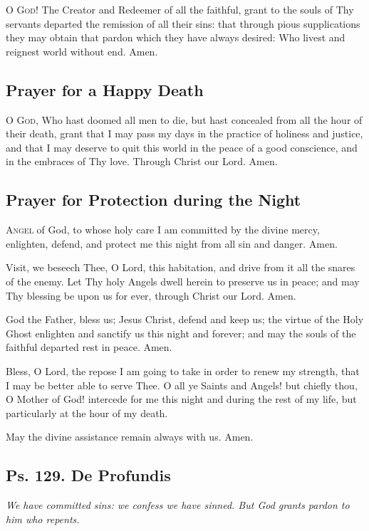 \documentclass[9pt]{article}
\begin{document}
\begin{multicols}{3}
\textsc{O God!} The Creator and Redeemer of all the faithful, grant to the souls
of Thy servants departed the remission of all their sins: that through pious
supplications they may obtain that pardon which they have always desired: Who
livest and reignest world without end. Amen.

\subsection*{Prayer for a Happy Death}

\textsc{O God,} Who hast doomed all men to die, but hast concealed from all the
hour of their death, grant that I may pass my days in the practice of holiness
and justice, and that I may deserve to quit this world in the peace of a good
conscience, and in the embraces of Thy love.  Through Christ our Lord. Amen.

\subsection*{Prayer for Protection during the Night}

\textsc{Angel} of God, to whose holy care I am committed by the divine mercy,
enlighten, defend, and protect me this night from all sin and danger.  Amen.

Visit, we beseech Thee, O Lord, this habitation, and drive from it all the
snares of the enemy.  Let Thy holy Angels dwell herein to preserve us in peace;
and may Thy blessing be upon us for ever, through Christ our Lord.  Amen.

God the Father, bless us; Jesus Christ, defend and keep us; the virtue of the
Holy Ghost enlighten and sanctify us this night and forever; and may the souls
of the faithful departed rest in peace.  Amen.

Bless, O Lord, the repose I am going to take in order to renew my strength, that
I may be better able to serve Thee.  O all ye Saints and Angels! but chiefly
thou, O Mother of God! intercede for me this night and during the rest of my
life, but particularly at the hour of my death.

May the divine assistance remain always with us. Amen.

\subsection*{Ps. 129.  De Profundis}

\textit{We have committed sins: we confess we have sinned.  But God grants pardon
to him who repents.}


\end{multicols}
\end{document}
